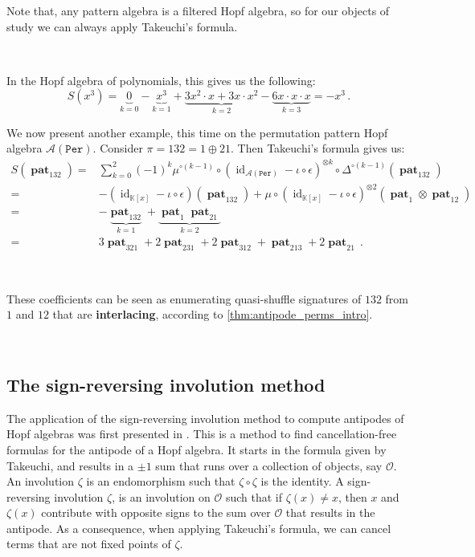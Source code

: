 \documentclass[12pt, reqno]{amsart}
\theoremstyle{definition}
\DeclareMathOperator{\id}{id}
\DeclareMathOperator{\pat}{\mathbf{pat}}
\begin{document}
Note that, any pattern algebra is a filtered Hopf algebra, so for our objects of study we can always apply Takeuchi's formula.

\

In the Hopf algebra of polynomials, this gives us the following:
$$S(x^3) = \underbrace{0}_{k = 0} - \underbrace{x^3}_{k = 1} + \underbrace{3 x^2 \cdot x + 3 x \cdot x^2}_{k=2} - \underbrace{6 x \cdot x \cdot x}_{k = 3} = - x^3 \, .$$


We now present another example, this time on the permutation pattern Hopf algebra $\mathcal A(\mathtt{Per})$.
Consider $\pi = 132 = 1 \oplus 21$. Then Takeuchi's formula gives us:
\begin{align*}
S(\pat_{132}) =& \sum_{k=0}^2 (-1)^k \mu^{\circ (k-1)} \circ (\id_{\mathcal A(\mathtt{Per})} - \iota \circ \epsilon)^{\otimes k} \circ \Delta^{\circ (k-1)}(\pat_{132})\\
=& -(\id_{\mathbb{K}[x]} - \iota \circ \epsilon)(\pat_{132}) + \mu \circ (\id_{\mathbb{K}[x]} - \iota\circ\epsilon)^{\otimes 2}(\pat_1 \otimes \pat_{12}) \\
=& - \underbrace{\pat_{132}}_{k=1} + \underbrace{\pat_1 \pat_{21}}_{k=2} \\
=& 3 \pat_{321} + 2 \pat_{231} + 2 \pat_{312} + \pat_{213} + 2 \pat_{21} \, .
\end{align*}

\

These coefficients can be seen as enumerating quasi-shuffle signatures of $132$ from $1$ and $12$ that are \textbf{interlacing}, according to \cref{thm:antipode_perms_intro}.



\

\subsection{The sign-reversing involution method}

The application of the sign-reversing involution method to compute antipodes of Hopf algebras was first presented in \cite{BS2017}.
This is a method to find cancellation-free formulas for the antipode of a Hopf algebra.
It starts in the formula given by Takeuchi, and results in a $\pm1$ sum that runs over a collection of objects, say $\mathcal O$.
An involution $\zeta $ is an endomorphism such that $\zeta \circ \zeta$ is the identity.
A sign-reversing involution $\zeta $, is an involution on $\mathcal O$ such that if $\zeta(x) \neq x$, then $x$ and $\zeta(x)$ contribute with opposite signs to the sum over $\mathcal O$ that results in the antipode.
As a consequence, when applying Takeuchi's formula, we can cancel terms that are not fixed points of $\zeta$.
\end{document}

